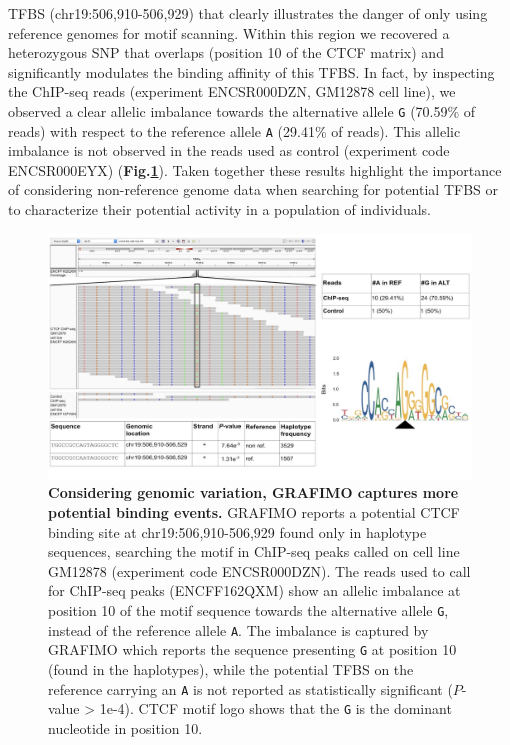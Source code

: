 \documentclass[a4paper, titlepage, openright]{book}
\begin{document}
TFBS (chr19:506,910-506,929) that clearly illustrates the danger of only using reference genomes for motif scanning. Within this region we recovered a heterozygous SNP that overlaps (position 10 of the CTCF matrix) and significantly modulates the binding affinity of this TFBS. In fact, by inspecting the ChIP-seq reads (experiment ENCSR000DZN, GM12878 cell line), we observed a clear allelic imbalance towards the alternative allele \texttt{G} (70.59\% of reads) with respect to the reference allele \texttt{A} (29.41\% of reads). This allelic imbalance is not observed in the reads used as control (experiment code ENCSR000EYX) (\textbf{Fig.\ref{fig:grafimo2}}). Taken together these results highlight the importance of considering non-reference genome data when searching for potential TFBS or to characterize their potential activity in a population of individuals.
\begin{figure}
	\centering
	\includegraphics[width=\textwidth]{figures/grafimo2.jpg}
	\caption[Considering genomic variation, GRAFIMO captures more potential binding events]{\textbf{Considering genomic variation, GRAFIMO captures more potential binding events.} GRAFIMO reports a potential CTCF binding site at chr19:506,910-506,929 found only in haplotype sequences, searching the motif in ChIP-seq peaks called on cell line GM12878 (experiment code ENCSR000DZN). The reads used to call for ChIP-seq peaks (ENCFF162QXM) show an allelic imbalance at position 10 of the motif sequence towards the alternative allele \texttt{G}, instead of the reference allele \texttt{A}. The imbalance is captured by GRAFIMO which reports the sequence presenting \texttt{G} at position 10 (found in the haplotypes), while the potential TFBS on the reference carrying an \texttt{A} is not reported as statistically significant ($P$-value > 1e-4). CTCF motif logo shows that the \texttt{G} is the dominant nucleotide in position 10.}
	\label{fig:grafimo2}
\end{figure} 
\end{document}
